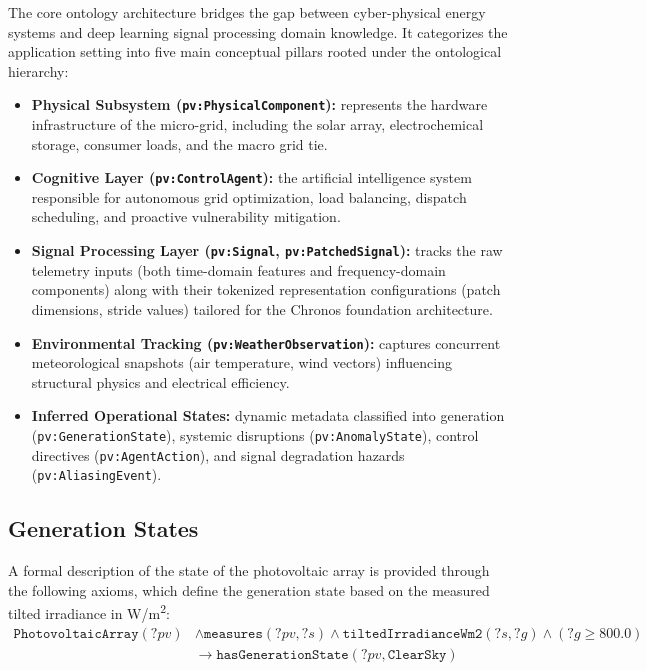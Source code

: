 The core ontology architecture bridges the gap between cyber-physical energy systems and deep learning signal processing domain knowledge. It categorizes the application setting into five main conceptual pillars rooted under the ontological hierarchy:

\begin{itemize}
    \item \textbf{Physical Subsystem (\texttt{pv:PhysicalComponent}):} represents the hardware infrastructure of the micro-grid, including the solar array, electrochemical storage, consumer loads, and the macro grid tie.
    \item \textbf{Cognitive Layer (\texttt{pv:ControlAgent}):} the artificial intelligence system responsible for autonomous grid optimization, load balancing, dispatch scheduling, and proactive vulnerability mitigation.
    \item \textbf{Signal Processing Layer (\texttt{pv:Signal}, \texttt{pv:PatchedSignal}):} tracks the raw telemetry inputs (both time-domain features and frequency-domain components) along with their tokenized representation configurations (patch dimensions, stride values) tailored for the Chronos foundation architecture.
    \item \textbf{Environmental Tracking (\texttt{pv:WeatherObservation}):} captures concurrent meteorological snapshots (air temperature, wind vectors) influencing structural physics and electrical efficiency.
    \item \textbf{Inferred Operational States:} dynamic metadata classified into generation (\texttt{pv:GenerationState}), systemic disruptions (\texttt{pv:AnomalyState}), control directives (\texttt{pv:AgentAction}), and signal degradation hazards (\texttt{pv:AliasingEvent}).
\end{itemize}

\subsection{Generation States}
A formal description of the state of the photovoltaic array is provided through the following axioms, which define the generation state based on the measured tilted irradiance in W/m\textsuperscript{2}:
\begin{equation}
\begin{aligned}
\texttt{PhotovoltaicArray}(?pv) &\wedge \texttt{measures}(?pv, ?s) \wedge \texttt{tiltedIrradianceWm2}(?s, ?g) \wedge (?g \ge 800.0) \\
&\longrightarrow \texttt{hasGenerationState}(?pv, \texttt{ClearSky})
\end{aligned}
\end{equation}

